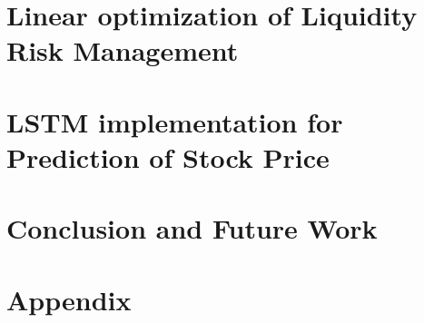 \documentclass[a4paper,12pt,oneside]{book}
\theoremstyle{plain}
\begin{document}
	\chapter{Linear optimization of Liquidity Risk Management}
	
	
	\chapter{LSTM implementation for Prediction of Stock Price}
	
	
	\chapter{Conclusion and Future Work}
	
	
	\clearpage
	
	
	\clearpage
	\appendix
	\chapter{Appendix}
	
	
	
\end{document}
